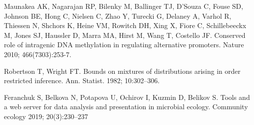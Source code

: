 \documentclass[12pt,aps]{revtex4}
\begin{document}
\begin{thebibliography}{00}
 Maunakea AK, Nagarajan RP, Bilenky M, Ballinger TJ, D'Souza C, Fouse SD, Johnson BE, Hong C, Nielsen C, Zhao Y, Turecki G, Delaney A, Varhol R, Thiessen N, Shchors K, Heine VM, Rowitch DH, Xing X, Fiore C, Schillebeeckx M, Jones SJ, Haussler D, Marra MA, Hirst M, Wang T, Costello JF. Conserved role of intragenic DNA methylation in regulating alternative promoters. Nature 2010; 466(7303):253-7. 

 Robertson T, Wright FT. Bounds on mixtures of distributions arising in order restricted inference. Ann. Statist. 1982; 10:302--306.

 Feranchuk S, Belkova N, Potapova U, Ochirov I, Kuzmin D, Belikov S. Tools and a web server for data analysis and presentation in microbial ecology. Community ecology 2019; 20(3):230--237

\end{thebibliography}
\end{document}
